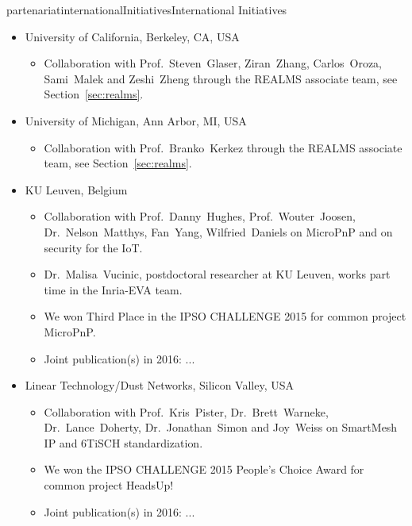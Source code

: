 \documentclass{ra2016}
\begin{document}
\begin{module}{partenariat}{internationalInitiatives}{International Initiatives}
\begin{itemize}
    \item University of California, Berkeley, CA, USA
        \begin{itemize}
            \item Collaboration with Prof.~Steven~Glaser, Ziran~Zhang, Carlos~Oroza, Sami~Malek and Zeshi~Zheng through the REALMS associate team, see Section~\ref{sec:realms}.
        \end{itemize}
    
    \item University of Michigan, Ann Arbor, MI, USA
        \begin{itemize}
            \item Collaboration with Prof.~Branko~Kerkez through the REALMS associate team, see Section~\ref{sec:realms}.
        \end{itemize}
    
    \item KU Leuven, Belgium
        \begin{itemize}
            \item Collaboration with Prof.~Danny~Hughes, Prof.~Wouter~Joosen, Dr.~Nelson~Matthys, Fan~Yang, Wilfried~Daniels on MicroPnP and on security for the IoT.
            \item Dr.~Malisa~Vucinic, postdoctoral researcher at KU Leuven, works part time in the Inria-EVA team.
            \item We won Third Place in the IPSO CHALLENGE 2015 for common project MicroPnP.
            \item Joint publication(s) in 2016: ... 
        \end{itemize}
    
    \item Linear Technology/Dust Networks, Silicon Valley, USA
        \begin{itemize}
            \item Collaboration with Prof.~Kris~Pister, Dr.~Brett~Warneke, Dr.~Lance~Doherty, Dr.~Jonathan~Simon and Joy~Weiss on SmartMesh IP and 6TiSCH standardization.
            \item We won the IPSO CHALLENGE 2015 People's Choice Award for common project HeadsUp!
            \item Joint publication(s) in 2016: ...
        \end{itemize}
    
\end{itemize}


%






\end{module}
\end{document}
